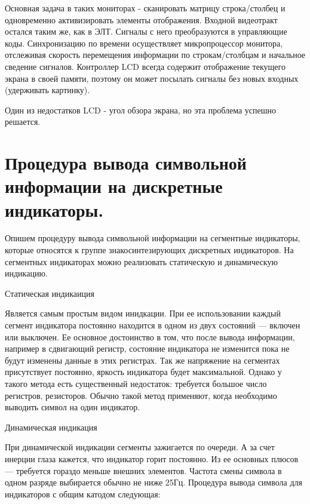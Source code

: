 \documentclass[unicode, 12pt, a4paper, oneside]{article}
\begin{document}
Основная задача в таких мониторах - сканировать матрицу строка/столбец и одновременно активизировать элементы отображения. Входной видеотракт остался таким же, как в ЭЛТ. Сигналы с него преобразуются в управляющие коды. Синхронизацию по времени осуществляет микропроцессор монитора, отслеживая скорость перемещения информации по строкам/столбцам и начальное сведение сигналов. Контроллер LCD всегда содержит отображение текущего экрана в своей памяти, поэтому он может посылать сигналы без новых входных (удерживать картинку).

Один из недостатков LCD - угол обзора экрана, но эта проблема успешно решается.

\section{Процедура вывода символьной информации на дискретные индикаторы.}

Опишем процедуру вывода символьной информации на сегментные индикаторы, которые относятся к группе знакосинтезирующих дискретных индикаторов. На сегментных индикаторах можно реализовать статическую и динамическую индикацию. 

Статическая индикаиция

Является самым простым видом инидкации. При ее использовании каждый сегмент индикатора постоянно находится в одном из двух состояний — включен или выключен. Ее основное достоинство в том, что после вывода информации, например в сдвигающий регистр, состояние индикатора не изменится пока не будут изменены данные в этих регистрах. Так же напряжение на сегментах присутствует постоянно, яркость индикатора будет максимальной. Однако у такого метода есть существенный недостаток: требуется большое число регистров, резисторов. Обычно такой метод применяют, когда необходимо выводить символ на один индикатор. 

Динамическая индикация

При динамической индикации сегменты зажигается по очереди. А за счет инерции глаза кажется, что индикатор горит постоянно. Из ее основных плюсов — требуется гораздо меньше внешних элементов. Частота смены символа в одном разряде выбирается обычно не ниже 25Гц. Процедура вывода символа для индикаторов с общим катодом следующая:
\end{document}
